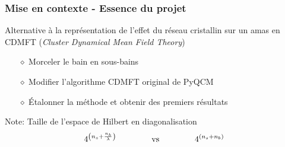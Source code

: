 
\begin{frame}
    \frametitle{Mise en contexte - Essence du projet}
    Alternative à la représentation de l'effet du réseau
    cristallin sur un amas en CDMFT (\textit{Cluster Dynamical Mean Field Theory})
    \vspace{0.3cm}
    \begin{itemize}
        \pause
        \item[$\diamond$] Morceler le bain en sous-bains
        \item[$\diamond$] Modifier l'algorithme CDMFT original de PyQCM\footnotemark
        \item[$\diamond$] Étalonner la méthode et obtenir des premiers résultats
    \end{itemize}
    \vfill
    \pause
    \begin{noteblock}{Note: Taille de l'espace de Hilbert en diagonalisation}
        \begin{align*}
            4^{\qty(n_s + \frac{n_b}{\lambda})}\hspace{1.5cm}\text{vs}\hspace{1.5cm}
          4^{(n_s + n_b)}
        \end{align*}
    \end{noteblock}
\end{frame}
